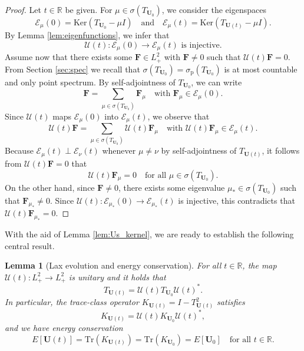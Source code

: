 \documentclass[10pt,reqno,a4paper]{amsart}
\newtheorem{lem}{Lemma}[section]
\theoremstyle{definition}
\theoremstyle{remark}
\theoremstyle{remark}
\numberwithin{equation}{section}
\newcommand{\R}{\mathbb{R}}
\renewcommand{\ker}{\mathrm{Ker}}
\renewcommand{\sp}{\sigma_{\mathrm{p}}}
\newcommand{\Ub}{\mathbf{U}}
\newcommand{\Fb}{\mathbf{F}}
\newcommand{\id}{I}
\newcommand{\Tr}{\mathrm{Tr}}
\newcommand{\Es}{\mathscr{E}}
\newcommand{\Us}{\mathscr{U}}
\begin{document}
\begin{proof}
Let $t \in \R$ be given. For $\mu \in \sigma(T_{\Ub_0})$, we consider the eigenspaces
$$
\Es_\mu(0) = \ker (T_{\Ub_0} - \mu \id) \quad \mbox{and} \quad \Es_\mu(t)= \ker (T_{\Ub(t)} - \mu \id).
$$
By Lemma \ref{lem:eigenfunctions}, we infer that
$$
\mbox{$\Us(t) : \Es_\mu(0) \to \Es_\mu(t)$ is injective.}
$$
Assume now that there exists some $\Fb \in L^2_+$ with $\Fb \neq 0$ such that $\Us(t) \Fb = 0$. From Section \ref{sec:spec} we recall that $\sigma(T_{\Ub_0}) = \sp(T_{\Ub_0})$ is at most countable and only point spectrum. By self-adjointness of $T_{\Ub_0}$, we can write
$$
\Fb = \sum_{\mu \in \sigma(T_{\Ub_0})} \Fb_\mu \quad \mbox{with $\Fb_\mu \in \Es_\mu(0)$}.
$$
Since $\Us(t)$ maps $\Es_\mu(0)$ into $\Es_\mu(t)$, we observe that
$$
\Us(t) \Fb = \sum_{\mu  \in \sigma(T_{\Ub_0})} \Us(t) \Fb_\mu \quad \mbox{with $\Us(t) \Fb_\mu \in \Es_\mu(t)$}.
$$
Because $\Es_\mu(t) \perp \Es_\nu(t)$ whenever $\mu \neq \nu$ by self-adjointness of $T_{\Ub(t)}$, it follows from $\Us(t) \Fb = 0$ that
$$
\Us(t) \Fb_\mu = 0 \quad \mbox{for all $\mu \in \sigma(T_{\Ub_0})$}.
$$
On the other hand, since $\Fb \neq 0$, there exists some eigenvalue $\mu_* \in \sigma(T_{\Ub_0})$ such that $\Fb_{\mu_*} \neq 0$. Since $\Us(t) : \Es_{\mu_*}(0) \to \Es_{\mu_*}(t)$ is injective, this contradicts that $\Us(t) \Fb_{\mu_*} = 0$.
\end{proof}


With the aid of Lemma \ref{lem:Us_kernel}, we are ready to establish the following central result.

\begin{lem}[Lax evolution and energy conservation] \label{lem:energy_conservation}
For all $t\in \R$, the map $\Us(t) : L^2_+ \to L^2_+$ is unitary and it holds that
$$
T_{\Ub(t)} = \Us(t) T_{\Ub_0} \Us(t)^*.
$$
In particular, the trace-class operator $K_{\Ub(t)} = \id - T_{\Ub(t)}^2$ satisfies 
$$
K_{\Ub(t)} = \Us(t) K_{\Ub_0} \Us(t)^*,
$$
and we have energy conservation
$$
E[\Ub(t)] = \Tr(K_{\Ub(t)}) = \Tr(K_{\Ub_0}) = E[\Ub_0] \quad \mbox{for all $t \in \R$}.
$$
\end{lem}
\end{document}
